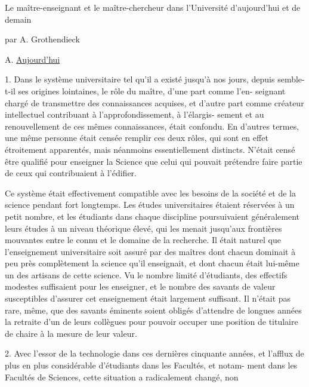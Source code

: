 
Le maître-enseignant et le maître-chercheur dans
l'Université d'aujourd'hui et de demain

par A. Grothendieck

A. \uline{Aujourd'hui}

1. Dans le système universitaire tel qu'il a existé jusqu'à nos jours, depuis
\margin{|} semble-t-il ses origines lointaines, le rôle du maître, d'une part comme l'en-%
seignant chargé de transmettre des connaissances acquises, et d'autre part
comme créateur intellectuel contribuant à l'approfondissement, à l'élargis-%
sement et au renouvellement de ces mêmes connaissances, était confondu. En
d'autres termes, une même personne était censée remplir ces deux rôles, qui
sont en effet étroitement apparentés, mais néanmoins essentiellement distincts.
N'était censé être qualifié pour enseigner la Science que celui qui pouvait
prétendre faire partie de ceux qui contribuaient à l'édifier.

Ce système était effectivement compatible avec les besoins de la
société et de la science pendant fort longtemps. Les études universitaires
étaient réservées à un petit nombre, et les étudiants dans chaque discipline
poursuivaient généralement leurs études à un niveau théorique élevé, qui les
menait jusqu'aux frontières mouvantes entre le connu et le domaine de la
recherche. Il était naturel que l'enseignement universitaire soit assuré par
des maîtres dont chacun dominait à peu près complètement la science qu'il
enseignait, et dont chacun était lui-même un des artisans de cette science.
Vu le nombre limité d'étudiants, des effectifs modestes suffisaient pour les
enseigner, et le nombre des savants de valeur susceptibles d'assurer cet
\margin{|} enseignement était largement suffisant. Il n'était pas rare, même, que des
savants éminents soient obligés d'attendre de longues années la retraite d'un
de leurs collègues pour pouvoir occuper une position de titulaire de chaire
à la mesure de leur valeur.

2. Avec l'essor de la technologie dans ces dernières cinquante années, et
l'afflux de plus en plus considérable d'étudiants dans les Facultés, et notam-%
ment dans les Facultés de Sciences, cette situation a radicalement changé, non

